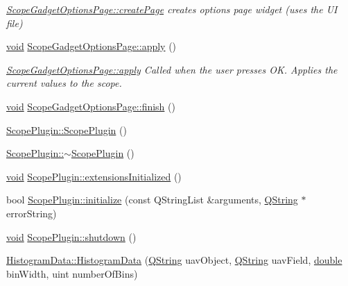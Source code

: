 \begin{DoxyCompactItemize}
\begin{DoxyCompactList}\small\item\em \hyperlink{group___scope_plugin_ga4032bc264c49c13a4bf81d5835a33206}{Scope\-Gadget\-Options\-Page\-::create\-Page} creates options page widget (uses the U\-I file) \end{DoxyCompactList}\item 
\hyperlink{group___u_a_v_objects_plugin_ga444cf2ff3f0ecbe028adce838d373f5c}{void} \hyperlink{group___scope_plugin_gaf046ff419274a440bbca457fd018c3e1}{Scope\-Gadget\-Options\-Page\-::apply} ()
\begin{DoxyCompactList}\small\item\em \hyperlink{group___scope_plugin_gaf046ff419274a440bbca457fd018c3e1}{Scope\-Gadget\-Options\-Page\-::apply} Called when the user presses O\-K. Applies the current values to the scope. \end{DoxyCompactList}\item 
\hyperlink{group___u_a_v_objects_plugin_ga444cf2ff3f0ecbe028adce838d373f5c}{void} \hyperlink{group___scope_plugin_ga106935101fc319a034138e2c37c02f8c}{Scope\-Gadget\-Options\-Page\-::finish} ()
\item 
\hyperlink{group___scope_plugin_ga199bf070e8b30f153774fed25c1bfb85}{Scope\-Plugin\-::\-Scope\-Plugin} ()
\item 
\hyperlink{group___scope_plugin_ga8c6b2fb4f5b848c5462148b93158ae5e}{Scope\-Plugin\-::$\sim$\-Scope\-Plugin} ()
\item 
\hyperlink{group___u_a_v_objects_plugin_ga444cf2ff3f0ecbe028adce838d373f5c}{void} \hyperlink{group___scope_plugin_ga92b5617116c8cbaa97c2f26bb2863ab3}{Scope\-Plugin\-::extensions\-Initialized} ()
\item 
bool \hyperlink{group___scope_plugin_gad49bcc2c25eda45814189ba82b8a1a5b}{Scope\-Plugin\-::initialize} (const Q\-String\-List \&arguments, \hyperlink{group___u_a_v_objects_plugin_gab9d252f49c333c94a72f97ce3105a32d}{Q\-String} $\ast$error\-String)
\item 
\hyperlink{group___u_a_v_objects_plugin_ga444cf2ff3f0ecbe028adce838d373f5c}{void} \hyperlink{group___scope_plugin_ga13799130d5adbbdc55c06e4597df6a08}{Scope\-Plugin\-::shutdown} ()
\item 
\hyperlink{group___scope_plugin_ga72e50dd5614c61d39ec10aa120c47d3b}{Histogram\-Data\-::\-Histogram\-Data} (\hyperlink{group___u_a_v_objects_plugin_gab9d252f49c333c94a72f97ce3105a32d}{Q\-String} uav\-Object, \hyperlink{group___u_a_v_objects_plugin_gab9d252f49c333c94a72f97ce3105a32d}{Q\-String} uav\-Field, \hyperlink{_super_l_u_support_8h_a8956b2b9f49bf918deed98379d159ca7}{double} bin\-Width, uint number\-Of\-Bins)

\end{DoxyCompactItemize}

